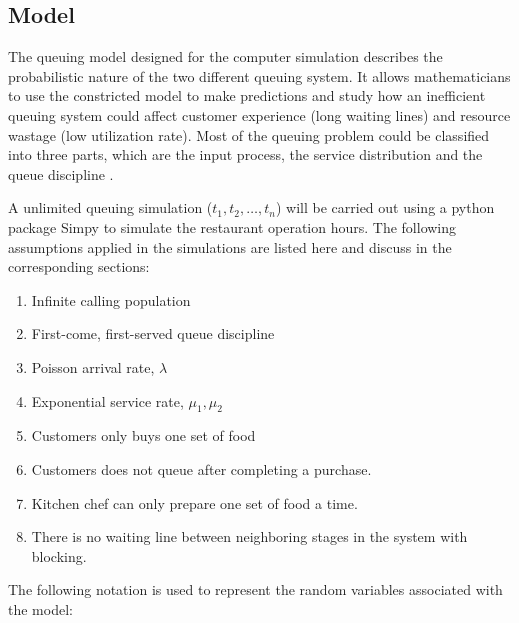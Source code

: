 \subsection{Model}
The queuing model designed for the computer simulation describes the probabilistic nature of the two different queuing system. It allows mathematicians to use the constricted model to make predictions and study how an inefficient queuing system could affect customer experience (long waiting lines) and resource wastage (low utilization rate).
Most of the queuing problem could be classified into three parts, which are the input process, the service distribution and the queue discipline \cite{PINSKY2011447}.

A unlimited queuing simulation ($t_1,t_2,\dots,t_n$) will be carried out using a python package Simpy \cite{grayson} to simulate the restaurant operation hours.
The following assumptions applied in the simulations are listed here and discuss in the corresponding sections:
\begin{enumerate}[label=\alph*)]
    \item Infinite calling population
    \item First-come, first-served queue discipline
    \item Poisson arrival rate, $\lambda$
    \item Exponential service rate, $\mu_1,\mu_2$
    \item Customers only buys one set of food
    \item Customers does not queue after completing a purchase.
    \item Kitchen chef can only prepare one set of food a time.
    \item There is no waiting line between neighboring stages in the system with blocking.
\end{enumerate}
The following notation is used to represent the random variables associated with the model:
